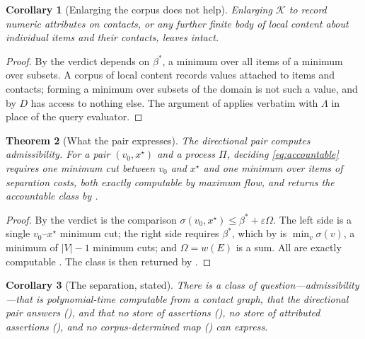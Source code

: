 \documentclass[11pt,twocolumn,a4paper]{article}
\theoremstyle{dirthm}
\newtheorem{theorem}{Theorem}[section]
\newtheorem{corollary}[theorem]{Corollary}
\theoremstyle{definition}
\theoremstyle{remark}
\newcommand{\V}{V}
\newcommand{\E}{E}
\newcommand{\wt}{w}
\newcommand{\flo}{\beta}
\newcommand{\str}{\sigma}
\newcommand{\Om}{\Omega}
\newcommand{\Proc}{\Pi}
\newcommand{\abs}[1]{\lvert#1\rvert}
\newcommand{\eps}{\varepsilon}
\begin{document}
\begin{corollary}[Enlarging the corpus does not help]
\label{cor:more-corpus}
Enlarging $\mathcal{K}$ to record numeric attributes on contacts, or any
further finite body of local content about individual items and their
contacts, leaves  intact.
\end{corollary}

\begin{proof}
By  the verdict depends on $\flo^{\ast}$, a
minimum over all items of a minimum over subsets. A corpus of local content
records values attached to items and contacts; forming a minimum over subsets
of the domain is not such a value, and by  $D$ has access
to nothing else. The argument of  applies verbatim with
$\Lambda$ in place of the query evaluator.
\end{proof}

\begin{theorem}[What the pair expresses]
\label{thm:pair-expresses}
The directional pair computes admissibility. For a pair $(v_0,x^{\star})$ and
a process $\Proc$, deciding \eqref{eq:accountable} requires one minimum cut
between $v_0$ and $x^{\star}$ and one minimum over items of separation costs,
both exactly computable by maximum flow, and returns the accountable class by
.
\end{theorem}

\begin{proof}
By  the verdict is the comparison
$\str(v_0,x^{\star})\le\flo^{\ast}+\eps\Om$. The left side is a single
$v_0$--$x^{\star}$ minimum cut; the right side requires $\flo^{\ast}$, which by
 is $\min_v\str(v)$, a minimum of $\abs{\V}-1$
minimum cuts; and $\Om=\wt(\E)$ is a sum. All are exactly computable
\citep{fordfulkerson1956,edmondskarp1972,stoer1997}. The class is then
returned by .
\end{proof}

\begin{corollary}[The separation, stated]
\label{cor:separation-stated}
There is a class of question---admissibility---that is polynomial-time
computable from a contact graph, that the directional pair answers
(), and that no store of assertions
(), no store of attributed assertions
(), and no corpus-determined map
() can express.
\end{corollary}
\end{document}
